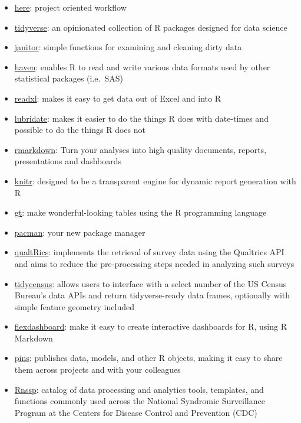 \documentclass[
  letterpaper,
  DIV=11,
  numbers=noendperiod]{scrreprt}
\providecommand{\tightlist}{%
  \setlength{\itemsep}{0pt}\setlength{\parskip}{0pt}}\usepackage{longtable,booktabs,array}
\begin{document}
\begin{itemize}
\tightlist
\item
  \href{https://here.r-lib.org/}{here}: project oriented workflow
\item
  \href{https://www.tidyverse.org/}{tidyverse}: an opinionated
  collection of R packages designed for data science
\item
  \href{https://sfirke.github.io/janitor/}{janitor}: simple functions
  for examining and cleaning dirty data
\item
  \href{https://haven.tidyverse.org/}{haven}: enables R to read and
  write various data formats used by other statistical packages
  (i.e.~SAS)
\item
  \href{https://readxl.tidyverse.org/}{readxl}: makes it easy to get
  data out of Excel and into R
\item
  \href{https://lubridate.tidyverse.org/}{lubridate}: makes it easier to
  do the things R does with date-times and possible to do the things R
  does not
\item
  \href{https://rmarkdown.rstudio.com/lesson-1.html}{rmarkdown}: Turn
  your analyses into high quality documents, reports, presentations and
  dashboards
\item
  \href{https://yihui.org/knitr/}{knitr}: designed to be a transparent
  engine for dynamic report generation with R
\item
  \href{https://gt.rstudio.com/}{gt}: make wonderful-looking tables
  using the R programming language
\item
  \href{https://github.com/trinker/pacman}{pacman}: your new package
  manager
\item
  \href{https://docs.ropensci.org/qualtRics/}{qualtRics}: implements the
  retrieval of survey data using the Qualtrics API and aims to reduce
  the pre-processing steps needed in analyzing such surveys
\item
  \href{https://walker-data.com/tidycensus/}{tidycensus}: allows users
  to interface with a select number of the US Census Bureau's data APIs
  and return tidyverse-ready data frames, optionally with simple feature
  geometry included
\item
  \href{https://pkgs.rstudio.com/flexdashboard/}{flexdashboard}: make it
  easy to create interactive dashboards for R, using R Markdown
\item
  \href{https://pins.rstudio.com/}{pins}: publishes data, models, and
  other R objects, making it easy to share them across projects and with
  your colleagues
\item
  \href{https://cdcgov.github.io/Rnssp/}{Rnssp}: catalog of data
  processing and analytics tools, templates, and functions commonly used
  across the National Syndromic Surveillance Program at the Centers for
  Disease Control and Prevention (CDC)
\end{itemize}
\end{document}

